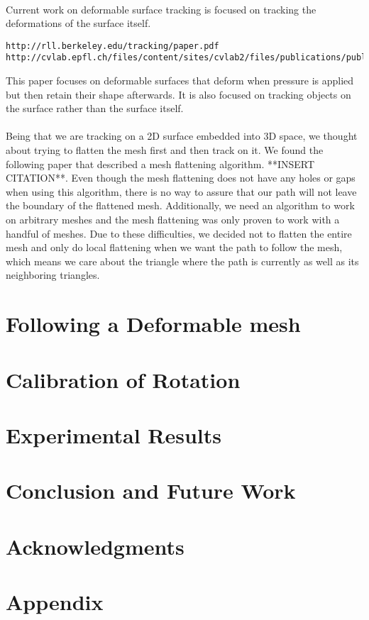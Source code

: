 \documentclass[11pt,psfig]{article}
\begin{document}
\\
Current work on deformable surface tracking is focused on tracking the deformations of the surface itself.
\begin{verbatim}
http://rll.berkeley.edu/tracking/paper.pdf
http://cvlab.epfl.ch/files/content/sites/cvlab2/files/publications/publications/2007/SalzmannHF07.pdf
\end{verbatim}
This paper focuses on deformable surfaces that deform when pressure is applied but then retain their shape afterwards. It is also focused on tracking objects on the surface rather than the surface itself.\\
\\
Being that we are tracking on a 2D surface embedded into 3D space, we thought about trying to flatten the mesh first and then track on it. We found the following paper that described a mesh flattening algorithm. **INSERT CITATION**. Even though the mesh flattening does not have any holes or gaps when using this algorithm, there is no way to assure that our path will not leave the boundary of the flattened mesh. Additionally, we need an algorithm to work on arbitrary meshes and the mesh flattening was only proven to work with a handful of meshes. Due to these difficulties, we decided not to flatten the entire mesh and only do local flattening when we want the path to follow the mesh, which means we care about the triangle where the path is currently as well as its neighboring triangles. 

\section*{Following a Deformable mesh}

\section*{Calibration of Rotation}

\section*{Experimental Results}

\section*{Conclusion and Future Work}

\section*{Acknowledgments}




\section*{Appendix}


\end{document}
